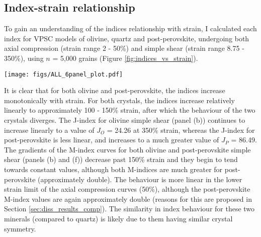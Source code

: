\documentclass[a4paper,12pt,twoside]{report}
\numberwithin{equation}{chapter}
\begin{document}
\subsection{Index-strain relationship}

To gain an understanding of the indices relationship with strain, I calculated each index for VPSC models of olivine, quartz and post-perovskite, undergoing both axial compression (strain range 2 - 50\%) and simple shear (strain range 8.75 - 350\%), using $n$ = 5,000 grains (Figure \ref{fig:indices_vs_strain}).     

\begin{figure*}[p]
  \centering
    \texttt{[image: figs/ALL\_6panel\_plot.pdf]}
  \caption[Relation of indices to strain (VPSC)]{Relationship between the J-index, continuous M-index and discrete M-index to sample strain. Data are from VPSC models, with the indices calculated using the same 5,000 grains at each strain step (this many grains ensures the results are in the convergent regime). Discrete M-index calculated with a bin size of 0.25$^\circ$. \textbf{Top row} shows data for olivine, \textbf{middle row} shows quartz and \textbf{bottom row} shows post-perovskite (P-PS). \textbf{Left column} shows data from an axial compression VPSC model, the \textbf{right column} shows data from a simple shear VPSC model. Note the change of scale on both y-axes in \textbf{f}. Applying these scales to other plots reduces clarity --- consistent scales on all other plots (within each column) allows for useful comparison (see text).}
  \label{fig:indices_vs_strain}
\end{figure*} 

It is clear that for both olivine and post-perovskite, the indices increase monotonically with strain. For both crystals, the indices increase relatively linearly to approximately 100 - 150\% strain, after which the behaviour of the two crystals diverges. The J-index for olivine simple shear (panel (b)) continues to increase linearly to a value of $J_O$ = 24.26 at 350\% strain, whereas the J-index for post-perovskite is less linear, and increases to a much greater value of $J_P$ = 86.49. The gradients of the M-index curves for both olivine and post-perovskite simple shear (panels (b) and (f)) decrease past 150\% strain and they begin to tend towards constant values, although both M-indices are much greater for post-perovskite (approximately double). The behaviour is more linear in the lower strain limit of the axial compression curves (50\%), although the post-perovskite M-index values are again approximately double (reasons for this are proposed in Section \ref{sec:diss_results_comp}). The similarity in index behaviour for these two minerals (compared to quartz) is likely due to them having similar crystal symmetry.
\end{document}
